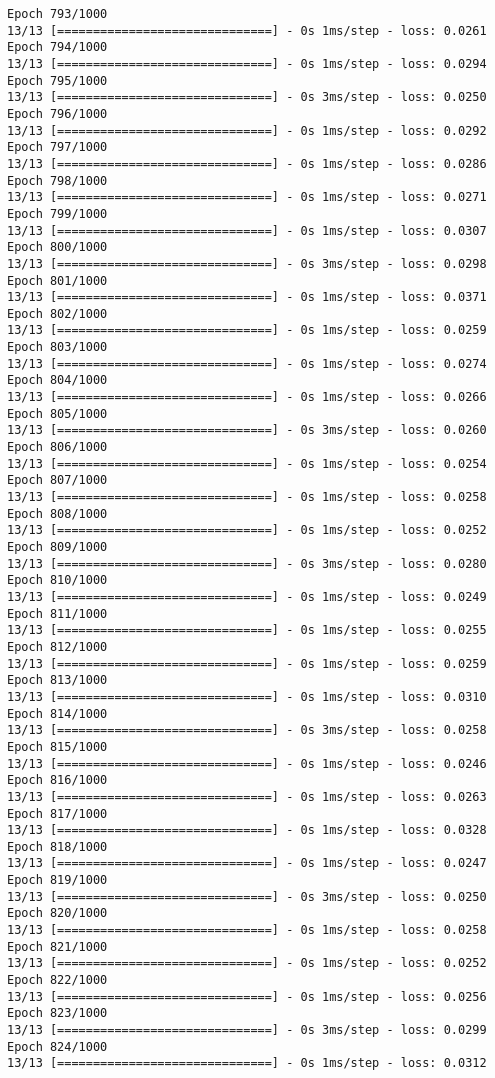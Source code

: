 \documentclass[11pt]{article}
\begin{document}
\begin{Verbatim}[commandchars=\\\{\}]
Epoch 793/1000
13/13 [==============================] - 0s 1ms/step - loss: 0.0261
Epoch 794/1000
13/13 [==============================] - 0s 1ms/step - loss: 0.0294
Epoch 795/1000
13/13 [==============================] - 0s 3ms/step - loss: 0.0250
Epoch 796/1000
13/13 [==============================] - 0s 1ms/step - loss: 0.0292
Epoch 797/1000
13/13 [==============================] - 0s 1ms/step - loss: 0.0286
Epoch 798/1000
13/13 [==============================] - 0s 1ms/step - loss: 0.0271
Epoch 799/1000
13/13 [==============================] - 0s 1ms/step - loss: 0.0307
Epoch 800/1000
13/13 [==============================] - 0s 3ms/step - loss: 0.0298
Epoch 801/1000
13/13 [==============================] - 0s 1ms/step - loss: 0.0371
Epoch 802/1000
13/13 [==============================] - 0s 1ms/step - loss: 0.0259
Epoch 803/1000
13/13 [==============================] - 0s 1ms/step - loss: 0.0274
Epoch 804/1000
13/13 [==============================] - 0s 1ms/step - loss: 0.0266
Epoch 805/1000
13/13 [==============================] - 0s 3ms/step - loss: 0.0260
Epoch 806/1000
13/13 [==============================] - 0s 1ms/step - loss: 0.0254
Epoch 807/1000
13/13 [==============================] - 0s 1ms/step - loss: 0.0258
Epoch 808/1000
13/13 [==============================] - 0s 1ms/step - loss: 0.0252
Epoch 809/1000
13/13 [==============================] - 0s 3ms/step - loss: 0.0280
Epoch 810/1000
13/13 [==============================] - 0s 1ms/step - loss: 0.0249
Epoch 811/1000
13/13 [==============================] - 0s 1ms/step - loss: 0.0255
Epoch 812/1000
13/13 [==============================] - 0s 1ms/step - loss: 0.0259
Epoch 813/1000
13/13 [==============================] - 0s 1ms/step - loss: 0.0310
Epoch 814/1000
13/13 [==============================] - 0s 3ms/step - loss: 0.0258
Epoch 815/1000
13/13 [==============================] - 0s 1ms/step - loss: 0.0246
Epoch 816/1000
13/13 [==============================] - 0s 1ms/step - loss: 0.0263
Epoch 817/1000
13/13 [==============================] - 0s 1ms/step - loss: 0.0328
Epoch 818/1000
13/13 [==============================] - 0s 1ms/step - loss: 0.0247
Epoch 819/1000
13/13 [==============================] - 0s 3ms/step - loss: 0.0250
Epoch 820/1000
13/13 [==============================] - 0s 1ms/step - loss: 0.0258
Epoch 821/1000
13/13 [==============================] - 0s 1ms/step - loss: 0.0252
Epoch 822/1000
13/13 [==============================] - 0s 1ms/step - loss: 0.0256
Epoch 823/1000
13/13 [==============================] - 0s 3ms/step - loss: 0.0299
Epoch 824/1000
13/13 [==============================] - 0s 1ms/step - loss: 0.0312

\end{Verbatim}
\end{document}
